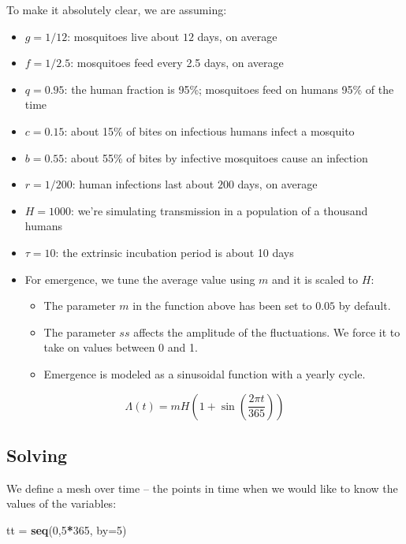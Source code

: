 \documentclass[
]{book}
\newenvironment{Shaded}{\begin{snugshade}}{\end{snugshade}}
\newcommand{\AttributeTok}[1]{\textcolor[rgb]{0.13,0.29,0.53}{#1}}
\newcommand{\DecValTok}[1]{\textcolor[rgb]{0.00,0.00,0.81}{#1}}
\newcommand{\FunctionTok}[1]{\textcolor[rgb]{0.13,0.29,0.53}{\textbf{#1}}}
\newcommand{\NormalTok}[1]{#1}
\newcommand{\OtherTok}[1]{\textcolor[rgb]{0.56,0.35,0.01}{#1}}
\newcommand{\SpecialCharTok}[1]{\textcolor[rgb]{0.81,0.36,0.00}{\textbf{#1}}}
\begin{document}
To make it absolutely clear, we are assuming:

\begin{itemize}
\item
  \(g=1/12\): mosquitoes live about \(12\) days, on average
\item
  \(f=1/2.5\): mosquitoes feed every 2.5 days, on average
\item
  \(q=0.95\): the human fraction is 95\%; mosquitoes feed on humans 95\% of the time
\item
  \(c=0.15\): about 15\% of bites on infectious humans infect a mosquito
\item
  \(b=0.55\): about 55\% of bites by infective mosquitoes cause an infection
\item
  \(r=1/200\): human infections last about \(200\) days, on average
\item
  \(H=1000\): we're simulating transmission in a population of a thousand humans
\item
  \(\tau=10\): the extrinsic incubation period is about 10 days
\item
  For emergence, we tune the average value using \(m\) and it is scaled to \(H\):

  \begin{itemize}
  \item
    The parameter \(m\) in the function above has been set to \(0.05\) by default.
  \item
    The parameter \(ss\) affects the amplitude of the fluctuations. We force it to take on values between 0 and 1.
  \item
    Emergence is modeled as a sinusoidal function with a yearly cycle.
  \end{itemize}
\end{itemize}

\[\Lambda(t) = m H \left(1 + \sin \left(\frac{2\pi t}{365}\right)\right)\]

\subsection{Solving}\label{solving-2}

We define a mesh over time -- the points in time when we would like to know the values of the variables:

\begin{Shaded}
\begin{Highlighting}[]
\NormalTok{tt }\OtherTok{=} \FunctionTok{seq}\NormalTok{(}\DecValTok{0}\NormalTok{,}\DecValTok{5}\SpecialCharTok{*}\DecValTok{365}\NormalTok{, }\AttributeTok{by=}\DecValTok{5}\NormalTok{) }
\end{Highlighting}
\end{Shaded}
\end{document}

